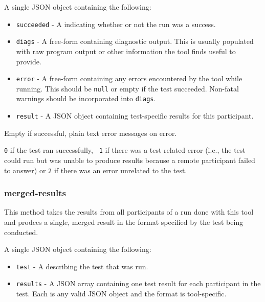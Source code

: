 \documentclass[10pt,titlepage]{article}
\begin{document}
 A single JSON object containing the following:

\begin{itemize}
\item{\tt succeeded} - A  indicating whether or not
  the run was a success.

\item{\tt diags} - A free-form  containing diagnostic
  output.  This is usually populated with raw program output or other
  information the tool finds useful to provide.

\item{\tt error} - A free-form  containing any errors
  encountered by the tool while running.  This should be {\tt null} or
  empty if the test succeeded.  Non-fatal warnings should be
  incorporated into {\tt diags}.

\item{\tt result} - A JSON object containing test-specific results for
  this participant.

\end{itemize}

 Empty if successful, plain text error
messages on error.

 {\tt 0} if the test ran successfully, {\tt
  1} if there was a test-related error (i.e., the test could run but
was unable to produce results because a remote participant failed to
answer) or {\tt 2} if there was an error unrelated to the test.



\subsubsection{merged-results}

This method takes the results from all participants of a run done with
this tool and prodces a single, merged result in the format specified
by the test being conducted.

 A single JSON object containing the following:

\begin{itemize}

\item{\tt test} - A  describing the test
  that was run.

\item{\tt results} - A JSON array containing one test result for each
  participant in the test.  Each is any valid JSON object and the
  format is tool-specific.

\end{itemize}
\end{document}
